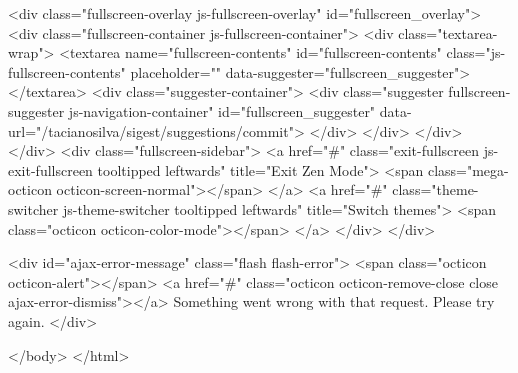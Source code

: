     <div class="fullscreen-overlay js-fullscreen-overlay" id="fullscreen_overlay">
  <div class="fullscreen-container js-fullscreen-container">
    <div class="textarea-wrap">
      <textarea name="fullscreen-contents" id="fullscreen-contents" class="js-fullscreen-contents" placeholder="" data-suggester="fullscreen_suggester"></textarea>
          <div class="suggester-container">
              <div class="suggester fullscreen-suggester js-navigation-container" id="fullscreen_suggester"
                 data-url="/tacianosilva/sigest/suggestions/commit">
              </div>
          </div>
    </div>
  </div>
  <div class="fullscreen-sidebar">
    <a href="#" class="exit-fullscreen js-exit-fullscreen tooltipped leftwards" title="Exit Zen Mode">
      <span class="mega-octicon octicon-screen-normal"></span>
    </a>
    <a href="#" class="theme-switcher js-theme-switcher tooltipped leftwards"
      title="Switch themes">
      <span class="octicon octicon-color-mode"></span>
    </a>
  </div>
</div>



    <div id="ajax-error-message" class="flash flash-error">
      <span class="octicon octicon-alert"></span>
      <a href="#" class="octicon octicon-remove-close close ajax-error-dismiss"></a>
      Something went wrong with that request. Please try again.
    </div>

  </body>
</html>

